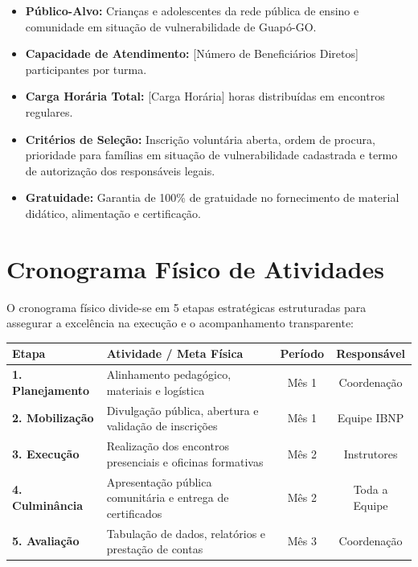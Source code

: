 \documentclass[12pt,a4paper]{article}
\begin{document}
\begin{itemize}
    \item \textbf{Público-Alvo:} Crianças e adolescentes da rede pública de ensino e comunidade em situação de vulnerabilidade de Guapó-GO.
    \item \textbf{Capacidade de Atendimento:} [Número de Beneficiários Diretos] participantes por turma.
    \item \textbf{Carga Horária Total:} [Carga Horária] horas distribuídas em encontros regulares.
    \item \textbf{Critérios de Seleção:} Inscrição voluntária aberta, ordem de procura, prioridade para famílias em situação de vulnerabilidade cadastrada e termo de autorização dos responsáveis legais.
    \item \textbf{Gratuidade:} Garantia de 100\% de gratuidade no fornecimento de material didático, alimentação e certificação.
\end{itemize}

\newpage

\section{Cronograma Físico de Atividades}

O cronograma físico divide-se em 5 etapas estratégicas estruturadas para assegurar a excelência na execução e o acompanhamento transparente:

\begin{table}[h!]
\centering
\small
\renewcommand{\arraystretch}{1.2}
\begin{tabularx}{\textwidth}{@{}>{\bfseries}l X c c@{}}
\toprule
Etapa & Atividade / Meta Física & Período & Responsável \\
\midrule
1. Planejamento & Alinhamento pedagógico, materiais e logística & Mês 1 & Coordenação \\
2. Mobilização & Divulgação pública, abertura e validação de inscrições & Mês 1 & Equipe IBNP \\
3. Execução & Realização dos encontros presenciais e oficinas formativas & Mês 2 & Instrutores \\
4. Culminância & Apresentação pública comunitária e entrega de certificados & Mês 2 & Toda a Equipe \\
5. Avaliação & Tabulação de dados, relatórios e prestação de contas & Mês 3 & Coordenação \\
\bottomrule
\end{tabularx}
\end{table}
\end{document}
